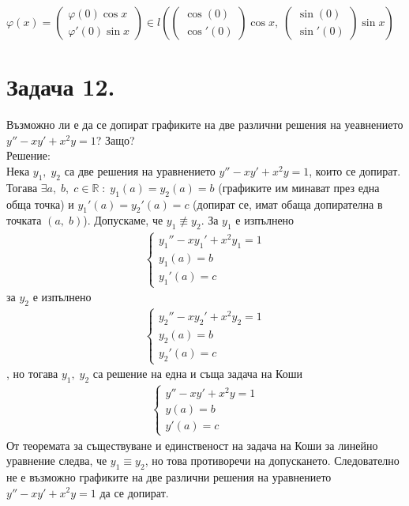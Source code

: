 \documentclass[a4paper, 12pt, oneside]{article}
\newcommand{\R}{\mathbb{R}}
\begin{document}
$\varphi(x) = \begin{pmatrix}
    \varphi(0)\cos x \\
    \varphi'(0)\sin x
\end{pmatrix} \in \displaystyle l \left(\begin{pmatrix}
    \cos(0) \\
    \cos'(0)
\end{pmatrix} \cos x , \; \begin{pmatrix}
    \sin(0) \\
    \sin'(0)
\end{pmatrix} \sin x\right)$

\section{Задача 12.}
Възможно ли е  да се допират графиките на две различни решения
на уеавнението $y'' -xy' + x^2y = 1$? Защо? \\

Решение: \\

Нека $y_1, \; y_2$ са две решения на уравнението $y'' -xy' + x^2y = 1$,
които се допират. Тогава $\exists a, \; b, \; c \in \R \; : \; y_1(a) = y_2(a) = b$ (графиките им минават през една обща точка)
и $y_1'(a) = y_2'(a) = c$ (допират се, имат обаща допирателна в точката $(a, \; b)$).
Допускаме, че $y_1 \not\equiv y_2$. За $y_1$ е изпълнено
\begin{align*}
    \begin{cases}
        y_1'' -xy_1' + x^2y_1 = 1 \\
        y_1(a) = b \\
        y_1'(a) = c
    \end{cases}
\end{align*} за $y_2$ е изпълнено
\begin{align*}
    \begin{cases}
        y_2'' -xy_2' + x^2y_2 = 1 \\
        y_2(a) = b \\
        y_2'(a) = c
    \end{cases}
\end{align*}, но тогава $y_1, \; y_2$ са решение на една и съща задача на Коши
\begin{align*}
    \begin{cases}
        y'' -xy' + x^2y = 1 \\
        y(a) = b \\
        y'(a) = c
    \end{cases}
\end{align*}
От теоремата за съществуване и единственост на задача на Коши за линейно уравнение
следва, че $y_1 \equiv y_2$, но това противоречи на допускането. Следователно не е
възможно графиките на две различни решения на уравнението $y'' -xy' + x^2y = 1$ да
се допират.
\end{document}
